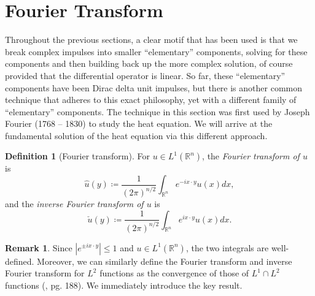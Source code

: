 \documentclass[openany, amssymb, psamsfonts]{amsart}
\theoremstyle{definition}
\newtheorem{defn}{Definition}[section]
\newtheorem{rem}{Remark}[section]
\numberwithin{equation}{section}
\newcommand{\bbr}{\mathbb{R}}
\begin{document}
\section{Fourier Transform}
Throughout the previous sections, a clear motif that has been used is that we break complex impulses into smaller ``elementary'' components, solving for these components and then building back up the more complex solution, of course provided that the differential operator is linear. So far, these ``elementary'' components have been Dirac delta unit impulses, but there is another common technique that adheres to this exact philosophy, yet with a different family of ``elementary'' components. The technique in this section was first used by Joseph Fourier (1768 – 1830) to study the heat equation. We will arrive at the fundamental solution of the heat equation via this different approach.
\begin{defn} [Fourier transform]
    For $u \in L^1(\bbr^n)$, the \textit{Fourier transform of $u$} is \begin{equation}
        \hat{u}(y) \coloneqq \frac{1}{(2\pi)^{n/2}} \int_{\bbr^n} e^{-ix \cdot y} u(x) dx,
    \end{equation}
    and the \textit{inverse Fourier transform of $u$} is
    \begin{equation}
    \check{u} (y) \coloneqq \frac{1}{(2\pi)^{n/2}} \int_{\bbr^n} e^{ix \cdot y} u(x) dx.
    \end{equation}
\end{defn}

\begin{rem}
Since $|e^{\pm ix \cdot y}| \leq 1$ and $u \in L^1(\bbr^n)$, the two integrals are well-defined. Moreover, we can similarly define the Fourier transform and inverse Fourier transform for $L^2$ functions as the convergence of those of $L^1 \cap L^2$ functions (\cite{Evans}, pg. 188). We immediately introduce the key result.
\end{rem}
\end{document}
